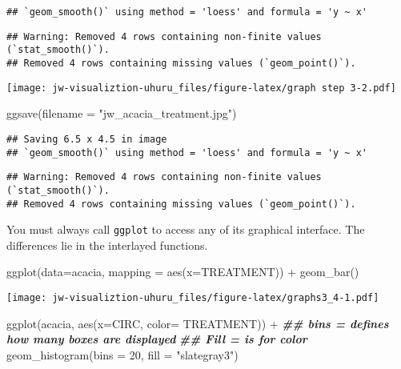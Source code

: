 \documentclass[
]{article}
\newenvironment{Shaded}{\begin{snugshade}}{\end{snugshade}}
\newcommand{\AttributeTok}[1]{\textcolor[rgb]{0.77,0.63,0.00}{#1}}
\newcommand{\DecValTok}[1]{\textcolor[rgb]{0.00,0.00,0.81}{#1}}
\newcommand{\DocumentationTok}[1]{\textcolor[rgb]{0.56,0.35,0.01}{\textbf{\textit{#1}}}}
\newcommand{\FunctionTok}[1]{\textcolor[rgb]{0.00,0.00,0.00}{#1}}
\newcommand{\NormalTok}[1]{#1}
\newcommand{\SpecialCharTok}[1]{\textcolor[rgb]{0.00,0.00,0.00}{#1}}
\newcommand{\StringTok}[1]{\textcolor[rgb]{0.31,0.60,0.02}{#1}}
\begin{document}
\begin{verbatim}
## `geom_smooth()` using method = 'loess' and formula = 'y ~ x'
\end{verbatim}

\begin{verbatim}
## Warning: Removed 4 rows containing non-finite values (`stat_smooth()`).
## Removed 4 rows containing missing values (`geom_point()`).
\end{verbatim}

\texttt{[image: jw-visualiztion-uhuru\_files/figure-latex/graph step 3-2.pdf]}

\begin{Shaded}
\begin{Highlighting}[]
  \FunctionTok{ggsave}\NormalTok{(}\AttributeTok{filename =} \StringTok{"jw\_acacia\_treatment.jpg"}\NormalTok{)}
\end{Highlighting}
\end{Shaded}

\begin{verbatim}
## Saving 6.5 x 4.5 in image
## `geom_smooth()` using method = 'loess' and formula = 'y ~ x'
\end{verbatim}

\begin{verbatim}
## Warning: Removed 4 rows containing non-finite values (`stat_smooth()`).
## Removed 4 rows containing missing values (`geom_point()`).
\end{verbatim}

You must always call \texttt{ggplot} to access any of its graphical
interface. The differences lie in the interlayed functions.

\begin{Shaded}
\begin{Highlighting}[]
\FunctionTok{ggplot}\NormalTok{(}\AttributeTok{data=}\NormalTok{acacia, }\AttributeTok{mapping =} \FunctionTok{aes}\NormalTok{(}\AttributeTok{x=}\NormalTok{TREATMENT)) }\SpecialCharTok{+}
  \FunctionTok{geom\_bar}\NormalTok{()}
\end{Highlighting}
\end{Shaded}

\texttt{[image: jw-visualiztion-uhuru\_files/figure-latex/graphs3\_4-1.pdf]}

\begin{Shaded}
\begin{Highlighting}[]
\FunctionTok{ggplot}\NormalTok{(acacia, }\FunctionTok{aes}\NormalTok{(}\AttributeTok{x=}\NormalTok{CIRC, }\AttributeTok{color=}\NormalTok{ TREATMENT)) }\SpecialCharTok{+}
  \DocumentationTok{\#\# \textasciigrave{}bins = \textasciigrave{} defines how many boxes are displayed }
  \DocumentationTok{\#\# \textasciigrave{}Fill = \textasciigrave{} is for color }
  \FunctionTok{geom\_histogram}\NormalTok{(}\AttributeTok{bins =} \DecValTok{20}\NormalTok{, }\AttributeTok{fill =} \StringTok{"slategray3"}\NormalTok{)}
\end{Highlighting}
\end{Shaded}
\end{document}
